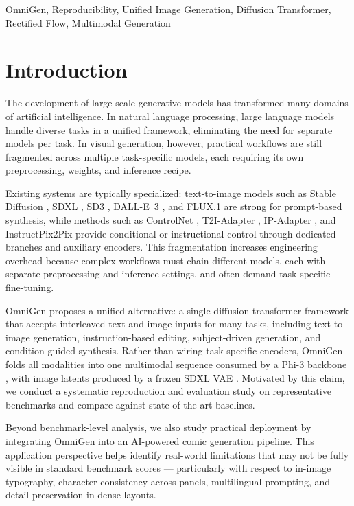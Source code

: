 \documentclass[conference]{IEEEtran}
\begin{document}
\begin{IEEEkeywords}
OmniGen, Reproducibility, Unified Image Generation, Diffusion Transformer, Rectified Flow, Multimodal Generation
\end{IEEEkeywords}

\section{Introduction}
\label{sec:introduction}

The development of large-scale generative models has transformed many domains of artificial intelligence. In natural language processing, large language models handle diverse tasks in a unified framework, eliminating the need for separate models per task. In visual generation, however, practical workflows are still fragmented across multiple task-specific models, each requiring its own preprocessing, weights, and inference recipe.

Existing systems are typically specialized: text-to-image models such as Stable Diffusion \cite{rombach2022high}, SDXL \cite{podell2023sdxl}, SD3 \cite{sd3}, DALL-E~3 \cite{dalle3}, and FLUX.1 \cite{flux2024} are strong for prompt-based synthesis, while methods such as ControlNet \cite{controlnet}, T2I-Adapter \cite{mou2024t2i}, IP-Adapter \cite{ye2023ipadapter}, and InstructPix2Pix \cite{brooks2023instructpix2pix} provide conditional or instructional control through dedicated branches and auxiliary encoders. This fragmentation increases engineering overhead because complex workflows must chain different models, each with separate preprocessing and inference settings, and often demand task-specific fine-tuning.

OmniGen \cite{omnigen2024} proposes a unified alternative: a single diffusion-transformer framework that accepts interleaved text and image inputs for many tasks, including text-to-image generation, instruction-based editing, subject-driven generation, and condition-guided synthesis. Rather than wiring task-specific encoders, OmniGen folds all modalities into one multimodal sequence consumed by a Phi-3 backbone \cite{phi3}, with image latents produced by a frozen SDXL VAE \cite{podell2023sdxl}. Motivated by this claim, we conduct a systematic reproduction and evaluation study on representative benchmarks and compare against state-of-the-art baselines.

Beyond benchmark-level analysis, we also study practical deployment by integrating OmniGen into an AI-powered comic generation pipeline. This application perspective helps identify real-world limitations that may not be fully visible in standard benchmark scores --- particularly with respect to in-image typography, character consistency across panels, multilingual prompting, and detail preservation in dense layouts.
\end{document}
